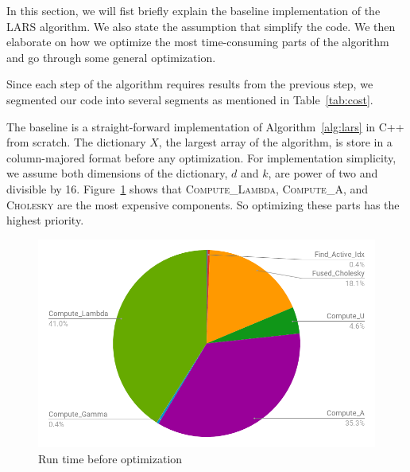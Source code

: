 
In this section, we will fist briefly explain the baseline implementation of the LARS algorithm.
We also state the assumption that simplify the code. 
We then elaborate on how we optimize the most time-consuming parts of the algorithm and go through some general optimization.



Since each step of the algorithm requires results from the previous step, we segmented our code into several segments as mentioned in Table~\ref{tab:cost}.

The baseline is a straight-forward implementation of Algorithm~\ref{alg:lars} in C++ from scratch. The dictionary $X$, the largest array of the algorithm, is store in a column-majored format before any optimization. For implementation simplicity, we assume both dimensions of the dictionary, $d$ and $k$, are power of two and divisible by 16. Figure~\ref{fig:pie_before} shows that \textsc{Compute\_Lambda}, \textsc{Compute\_A}, and \textsc{Cholesky} are the most expensive components. So optimizing these parts has the highest priority. 

\begin{figure}
\centering
  \includegraphics[scale=0.29]{./pic/pie_before.png}
  \caption{Run time before optimization}
  \label{fig:pie_before}
\end{figure}

